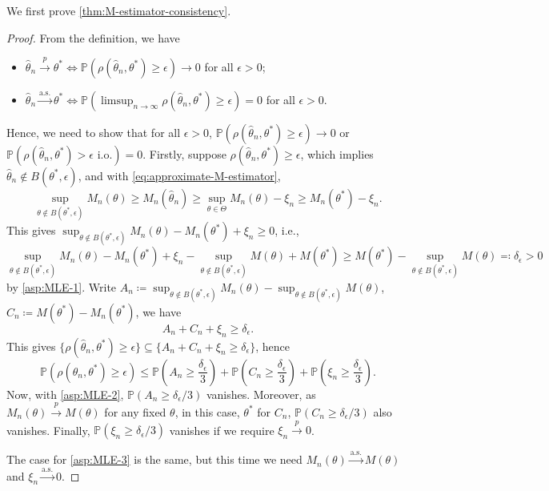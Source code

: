 We first prove \autoref{thm:M-estimator-consistency}.

\begin{proof}
	From the definition, we have
	\begin{itemize}
		\item \(\hat{\theta} _n \overset{p}{\to} \theta ^{\ast} \iff \mathbb{P} (\rho (\hat{\theta} _n, \theta ^{\ast} ) \geq \epsilon ) \to 0\) for all \(\epsilon > 0\);
		\item \(\hat{\theta} _n \overset{\text{a.s.} }{\to} \theta ^{\ast} \iff \mathbb{P} (\limsup_{n \to \infty} \rho (\hat{\theta} _n, \theta ^{\ast} ) \geq \epsilon ) = 0\) for all \(\epsilon > 0\).
	\end{itemize}
	Hence, we need to show that for all \(\epsilon > 0\), \(\mathbb{P} (\rho (\hat{\theta} _n , \theta ^{\ast} ) \geq \epsilon ) \to 0\) or \(\mathbb{P} (\rho (\hat{\theta} _n, \theta ^{\ast} ) > \epsilon \text{ i.o.} ) = 0\). Firstly, suppose \(\rho (\hat{\theta} _n, \theta ^{\ast} ) \geq \epsilon \), which implies \(\hat{\theta} _n \notin B(\theta ^{\ast} , \epsilon )\), and with \autoref{eq:approximate-M-estimator},
	\[
		\sup _{\theta \notin B(\theta ^{\ast} , \epsilon )} M_n(\theta )
		\geq M_n(\hat{\theta} _n)
		\geq \sup _{\theta \in \Theta } M_n(\theta ) - \xi _n
		\geq M_n(\theta ^{\ast} ) - \xi _n.
	\]
	This gives \(\sup _{\theta \notin B(\theta ^{\ast} , \epsilon )}M_n(\theta ) - M_n (\theta ^{\ast} ) + \xi _n \geq 0\), i.e.,
	\[
		\sup _{\theta \notin B(\theta ^{\ast} , \epsilon )} M_n(\theta ) - M_n(\theta ^{\ast} ) + \xi _n - \sup _{\theta \notin B(\theta ^{\ast} , \epsilon )} M(\theta ) + M(\theta ^{\ast} )
		\geq M(\theta ^{\ast} ) - \sup _{\theta \notin B(\theta ^{\ast} , \epsilon )} M(\theta )
		\eqqcolon \delta _\epsilon > 0
	\]
	by \autoref{asp:MLE-1}. Write \(A_n \coloneqq \sup _{\theta \notin B(\theta ^{\ast} , \epsilon )} M_n(\theta ) - \sup _{\theta \notin B(\theta ^{\ast} , \epsilon )} M(\theta )\), \(C_n \coloneqq M(\theta ^{\ast} ) - M_n(\theta ^{\ast} )\), we have
	\[
		A_n + C_n + \xi _n \geq \delta _\epsilon .
	\]
	This gives \(\{ \rho (\hat{\theta} _n, \theta ^{\ast} ) \geq \epsilon \} \subseteq \{ A_n + C_n + \xi _n \geq \delta _\epsilon  \}\), hence
	\[
		\mathbb{P} (\rho (\hat{\theta} _n, \theta ^{\ast} ) \geq \epsilon)
		\leq \mathbb{P} \left( A_n \geq \frac{\delta _\epsilon}{3} \right) + \mathbb{P} \left( C_n \geq \frac{\delta _\epsilon}{3} \right) + \mathbb{P} \left( \xi _n \geq \frac{\delta _\epsilon}{3} \right).
	\]
	Now, with \autoref{asp:MLE-2}, \(\mathbb{P} (A_n \geq \delta _\epsilon / 3)\) vanishes. Moreover, as \(M_n(\theta ) \overset{p}{\to} M(\theta )\) for any fixed \(\theta \), in this case, \(\theta ^{\ast} \) for \(C_n\), \(\mathbb{P} (C_n \geq \delta _\epsilon / 3)\) also vanishes. Finally, \(\mathbb{P} (\xi _n \geq \delta _\epsilon / 3)\) vanishes if we require \(\xi _n \overset{p}{\to} 0\).

	The case for \autoref{asp:MLE-3} is the same, but this time we need \(M_n(\theta ) \overset{\text{a.s.} }{\to} M(\theta ) \) and \(\xi _n \overset{\text{a.s.} }{\to} 0\).
\end{proof}

